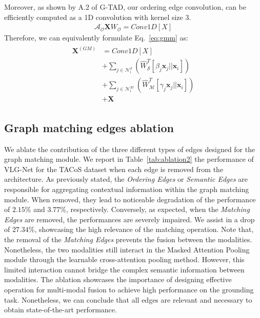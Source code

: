 \documentclass[10pt,twocolumn,letterpaper]{article}
\begin{document}
Moreover, as shown by A.2 of G-TAD\cite{Xu_2020_CVPR}, our ordering edge convolution, can be efficiently computed as a 1D convolution with kernel size 3.
\begin{align} \label{eq:gmm3} 
   \mathcal{A}_\mathcal{O} \mathbf{X} W_\mathcal{O} = Conv1D[X]
\end{align}
Therefore, we can equivalently formulate Eq.~\ref{eq:gmm} as:
\begin{align} \label{eq:gmm_final} 
\begin{split}
   \mathbf{X}^{(GM)} & =  Conv1D[X] \\ 
   & + \sum_{j\in \mathcal{N}_i^\mathcal{S}} ( \hat{W}_\mathcal{S}^T [\beta_j\mathbf{x}_{j}||\mathbf{x}_{i}]) \\ 
   & + \sum_{j\in \mathcal{N}_i^\mathcal{M}} ( \hat{W}_\mathcal{M}^T [\gamma_j\mathbf{x}_{j}||\mathbf{x}_{i}]) \\
   & + \mathbf{X}
\end{split}
\end{align}


\subsection*{Graph matching edges ablation}
We ablate the contribution of the three different types of edges designed for the graph matching module. 
We report in Table~\ref{tab:ablation2}  the performance of VLG-Net for the TACoS dataset when each edge is removed from the architecture.
As previously stated, the \textit{Ordering Edges} or \textit{Semantic Edges} are responsible for aggregating contextual information within the graph matching module. When removed, they lead to noticeable degradation of the performance of $2.15 \%$ and $3.77 \%$, respectively.
Conversely, as expected, when the \textit{Matching Edges} are removed, the performances are severely impaired. We assist in a drop of $27.34 \%$, showcasing the high relevance of the matching operation. 
Note that, the removal of the \textit{Matching Edges} prevents the fusion between the modalities. Nonetheless, the two modalities still interact in the Masked Attention Pooling module through the learnable cross-attention pooling method. However, this limited interaction cannot bridge the complex semantic information between modalities. 
The ablation showcases the importance of designing effective operation for multi-modal fusion to achieve high performance on the grounding task. 
Nonetheless, we can conclude that all edges are relevant and necessary to obtain state-of-the-art performance.
\end{document}
